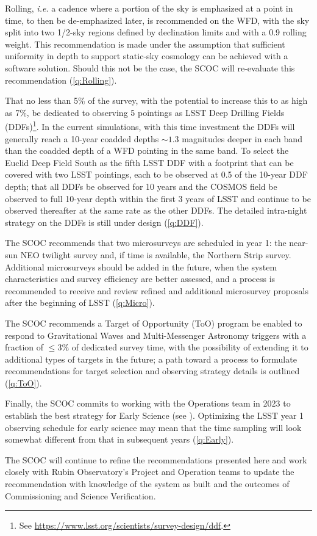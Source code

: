 \hangindent=0.7cm Rolling, \emph{i.e.} a cadence where a portion of the sky is emphasized at a point in time, to then be de-emphasized later, is recommended on the WFD, with the sky split into two 1/2-sky regions defined by declination limits and with a 0.9 rolling weight. This recommendation is made under the assumption that sufficient uniformity in depth to support static-sky cosmology can be achieved with a software solution.  Should this not be the case, the SCOC will re-evaluate this recommendation (\autoref{q:Rolling}).

\hangindent=0.7cm That no less than 5\% of the survey, with the potential to increase this to as high as 7\%, be dedicated to observing 5 pointings as LSST Deep Drilling Fields (DDFs)\footnote{See \url{https://www.lsst.org/scientists/survey-design/ddf}.}. In the current simulations, with this time investment the DDFs will generally reach a 10-year coadded depths $\sim1.3$ magnitudes deeper in each band than the coadded depth of a WFD pointing in the same band. To select the Euclid Deep Field South as the fifth LSST DDF with a footprint that can be covered with two LSST pointings, each to be observed at 0.5 of the 10-year DDF depth;  that all DDFs be observed for 10 years and the COSMOS field be observed to full 10-year depth within the first 3 years of LSST and continue to be observed thereafter at the same rate as the other DDFs. The detailed intra-night strategy on the DDFs is still under design (\autoref{q:DDF}).

\hangindent=0.7cm The SCOC recommends that two microsurveys are scheduled  in year 1: the near-sun NEO twilight survey and, if time is
available, the Northern Strip survey. Additional microsurveys should be added in the future, when the system characteristics and survey efficiency are better assessed, and a process is recommended to receive and review refined and additional microsurvey proposals after the beginning of LSST (\autoref{q:Micro}).

\hangindent=0.7cm The SCOC recommends a Target of Opportunity (ToO) program be enabled to respond to Gravitational Waves and Multi-Messenger Astronomy triggers with a fraction of $\leq 3\%$ of dedicated survey time, with the possibility of extending it to additional types of targets in the future; a path toward a process to formulate recommendations for target selection and observing strategy details is outlined (\autoref{q:ToO}).

\hangindent=0.7cm Finally, the SCOC commits to working with the Operations team in 2023 to establish the best strategy for Early Science (see ). Optimizing the LSST year 1 observing schedule for early science may mean that the time  sampling will look somewhat different from that in subsequent years (\autoref{q:Early}).

\noindent The SCOC will continue to refine the recommendations presented here and work closely with Rubin Observatory's Project and Operation teams to update the recommendation with knowledge of the system as built and the outcomes of Commissioning and Science Verification.

